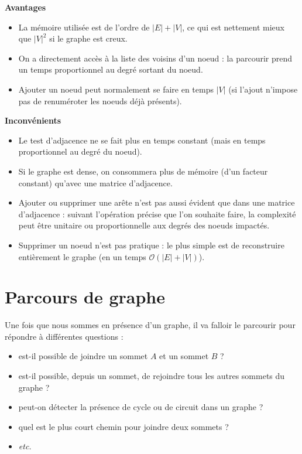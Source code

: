 \begin{minipage}[t]{.47\linewidth}
\begin{center}
\textbf{Avantages}
\end{center}
\begin{itemize}
\item La mémoire utilisée est de l’ordre de $|E| + |V|$, ce qui est nettement mieux que $|V|^2$ si le graphe est
creux.
\item On a directement accès à la liste des voisins d’un noeud : la parcourir prend un temps proportionnel
au degré sortant du noeud.%
\item Ajouter un noeud peut normalement se faire en temps $|V|$ (si l’ajout n’impose pas de renuméroter
les noeuds déjà présents).
\end{itemize}
\end{minipage}
\hfill
\begin{minipage}[t]{.47\linewidth}
\begin{center}
\textbf{Inconvénients}
\begin{itemize}
\item Le test d’adjacence ne se fait plus en temps constant (mais en temps proportionnel au degré du
noeud).
\item Si le graphe est dense, on consommera plus de mémoire (d’un facteur constant) qu’avec une matrice
d’adjacence.
\item Ajouter ou supprimer une arête n’est pas aussi évident que dans une matrice d’adjacence : suivant
l’opération précise que l’on souhaite faire, la complexité peut être unitaire ou proportionnelle aux
degrés des noeuds impactés.
\item  Supprimer un noeud n’est pas pratique : le plus simple est de reconstruire entièrement le graphe (en
un temps $\mathcal{O}\left(|E| + |V|\right)$).
\end{itemize}
\end{center}
\end{minipage}

\section{Parcours de graphe}
Une fois que nous sommes en présence d'un graphe, il va falloir le parcourir pour répondre à différentes questions : 
\begin{itemize}
\item est-il possible de joindre un sommet $A$ et un sommet $B$ ?
\item est-il possible, depuis un sommet, de rejoindre tous les autres sommets du graphe ?
\item peut-on détecter la présence de cycle ou de circuit dans un graphe ?
\item quel est le plus court chemin pour joindre deux sommets ?
\item \textit{etc.}
\end{itemize}

